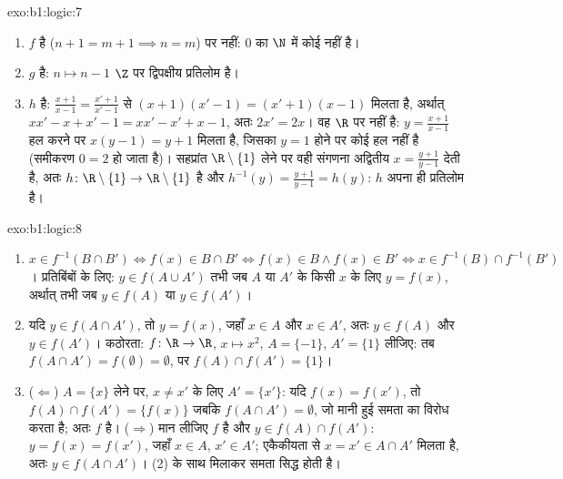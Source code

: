 \begin{solution}{exo:b1:logic:7}
\begin{enumerate}
  \item $f$  है ($n + 1 = m + 1 \implies n = m$) पर  नहीं: $0$
  का $\N$ में कोई  नहीं है।
  \item $g$  है: $n \mapsto n - 1$ $\Z$ पर द्विपक्षीय प्रतिलोम
  है।
  \item $h$  है: $\frac{x+1}{x-1} = \frac{x'+1}{x'-1}$ से $(x+1)(x'-1)
  = (x'+1)(x-1)$ मिलता है, अर्थात् $xx' - x + x' - 1 = xx' - x' + x - 1$,
  अतः $2x' = 2x$। वह $\R$ पर  नहीं है: $y = \frac{x+1}{x-1}$ हल करने
  पर $x(y - 1) = y + 1$ मिलता है, जिसका $y = 1$ होने पर कोई हल नहीं है
  (समीकरण $0 = 2$ हो जाता है)। सहप्रांत $\R \setminus \{1\}$ लेने पर वही
  संगणना अद्वितीय  $x = \frac{y+1}{y-1}$ देती है, अतः $h
  \colon \R \setminus \{1\} \to \R \setminus \{1\}$  है और
  $h^{-1}(y) = \frac{y+1}{y-1} = h(y)$: $h$ अपना ही प्रतिलोम है।
\end{enumerate}
\end{solution}

\begin{solution}{exo:b1:logic:8}
\begin{enumerate}
  \item $x \in f^{-1}(B \cap B') \iff f(x) \in B \cap B' \iff f(x) \in B
  \land f(x) \in B' \iff x \in f^{-1}(B) \cap f^{-1}(B')$। प्रतिबिंबों के
  लिए: $y \in f(A \cup A')$ तभी जब $A$ या $A'$ के किसी $x$ के लिए $y =
  f(x)$, अर्थात् तभी जब $y \in f(A)$ या $y \in f(A')$।
  \item यदि $y \in f(A \cap A')$, तो $y = f(x)$, जहाँ $x \in A$ और $x \in
  A'$, अतः $y \in f(A)$ और $y \in f(A')$। कठोरता: $f \colon \R \to \R$, $x
  \mapsto x^2$, $A = \{-1\}$, $A' = \{1\}$ लीजिए: तब $f(A \cap A') =
  f(\emptyset) = \emptyset$, पर $f(A) \cap f(A') = \{1\}$।
  \item ($\Leftarrow$) $A = \{x\}$ लेने पर, $x \neq x'$ के लिए $A' =
  \{x'\}$: यदि $f(x) = f(x')$, तो $f(A) \cap f(A') = \{f(x)\}$ जबकि $f(A
  \cap A') = \emptyset$, जो मानी हुई समता का विरोध करता है; अतः $f$ 
  है। ($\Rightarrow$) मान लीजिए $f$  है और $y \in f(A) \cap f(A')$: $y
  = f(x) = f(x')$, जहाँ $x \in A$, $x' \in A'$; एकैकीयता से $x = x' \in A
  \cap A'$ मिलता है, अतः $y \in f(A \cap A')$। (2) के साथ मिलाकर समता सिद्ध
  होती है।
\end{enumerate}
\end{solution}

